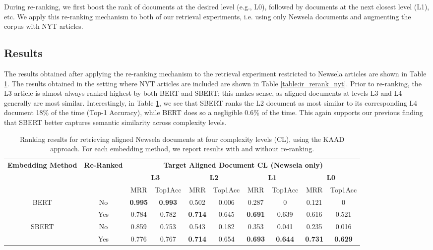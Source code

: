 \documentclass[thesis.tex]{subfiles}
\begin{document}
During re-ranking, we first boost the rank of documents at the desired level (e.g., L0), followed by documents at the next closest level (L1), etc. We apply this re-ranking mechanism to both of our retrieval experiments, i.e. using only Newsela documents and augmenting the corpus with NYT articles.

\subsection{Results}

The results obtained after applying the re-ranking mechanism to the retrieval experiment restricted to Newsela articles are shown in Table \ref{table:ir_rerank_newsela}. The results obtained in the setting where NYT articles are included are shown in Table \ref{table:ir_rerank_nyt}. Prior to re-ranking, the L3 article is almost always ranked highest by both BERT and SBERT; this makes sense, as aligned documents at levels L3 and L4 generally are most similar. Interestingly, in Table \ref{table:ir_rerank_newsela}, we see that SBERT ranks the L2 document as most similar to its corresponding L4 document 18\% of the time (Top-1 Accuracy), while BERT does so a negligible 0.6\% of the time. This again supports our previous finding that SBERT better captures semantic similarity across complexity levels.

\begin{table}
\begin{center}
\scriptsize
\begin{tabular}{|cc|cc|cc|cc|cc|}
\hline
\multirow{3}{1.7cm}{\centering \textbf{Embedding Method}} & \multirow{3}{1.2cm}{\centering \textbf{Re-Ranked}} &  \multicolumn{8}{|c|}{\textbf{Target Aligned Document CL (Newsela only)}} \\
& & \multicolumn{2}{|c|}{\textbf{L3}} & \multicolumn{2}{|c|}{\textbf{L2}} & \multicolumn{2}{|c|}{\textbf{L1}} & \multicolumn{2}{|c|}{\textbf{L0}} \\
& & MRR & Top1Acc & MRR & Top1Acc & MRR & Top1Acc & MRR & Top1Acc \\ \hline
\multirow{2}{1.7cm}{\centering BERT} & No & \textbf{0.995} & \textbf{0.993} & 0.502 & 0.006 & 0.287 & 0 & 0.121 & 0 \\
& Yes & 0.784 & 0.782 & \textbf{0.714} & 0.645 & \textbf{0.691} & 0.639 & 0.616 & 0.521 \\ \hline
\multirow{2}{1.7cm}{\centering SBERT} & No & 0.859 & 0.753 & 0.543 & 0.182 & 0.353 & 0.041 & 0.235 & 0.016 \\
& Yes & 0.776 & 0.767 & \textbf{0.714} & 0.654 & \textbf{0.693} & \textbf{0.644} & \textbf{0.731} & \textbf{0.629} \\ \hline
\end{tabular}
\end{center}
\caption{\label{table:ir_rerank_newsela} Ranking results for retrieving aligned Newsela documents at four complexity levels (CL), using the KAAD approach. For each embedding method, we report results with and without re-ranking.}
\end{table}
\end{document}

